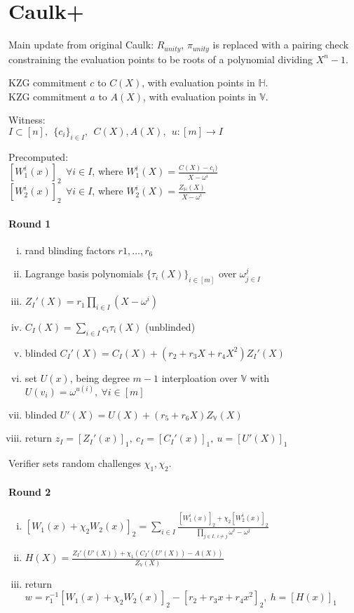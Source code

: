 \documentclass{article}
\theoremstyle{definition}
\begin{document}
\section{Caulk+}
Main update from original Caulk: $R_{unity}$, $\pi_{unity}$ is replaced with a pairing check constraining the evaluation points to be roots of a polynomial dividing $X^n-1$.

KZG commitment $c$ to $C(X)$, with evaluation points in $\mathbb{H}$.\\
KZG commitment $a$ to $A(X)$, with evaluation points in $\mathbb{V}$.

Witness:\\
$I \subset [n], ~~ \{ c_i \}_{i \in I} ,~~ C(X), A(X) ,~~ u: [m] \rightarrow I$

Precomputed:\\
$[W_1^i(x)]_2 ~~\forall i \in I$, where $W_1^i(X) = \frac{C(X) - c_i)}{X-\omega^i}$\\
$[W_2^i(x)]_2 ~~\forall i \in I$, where $W_2^i(X) = \frac{Z_{\mathbb{H}}(X)}{X-\omega^i}$

\paragraph{Round 1}
\begin{enumerate}[i.]
	\item rand blinding factors $r1, \ldots, r_6$
	\item Lagrange basis polynomials $\{ \tau_i(X) \}_{i \in [m]}$ over $\omega^j_{j \in I}$
	\item $Z_I'(X)= r_1 \prod_{i \in I} (X - \omega^i)$
	\item $C_I(X)=\sum_{i \in I} c_i \tau_i(X)$ (unblinded)
	\item blinded $C_I'(X)=C_I(X) + (r_2 + r_3 X + r_4 X^2) Z_I'(X)$
	\item set $U(x)$, being degree $m-1$ interploation over $\mathbb{V}$ with $U(v_i)=\omega^{u(i)},~ \forall i\in [m]$
	\item blinded $U'(X)= U(X) + (r_5 + r_6 X) Z_{\mathbb{V}}(X)$
	\item return $z_I=[Z_I'(x)]_1,~ c_I=[C_I'(x)]_1,~ u=[U'(X)]_1$
\end{enumerate}

Verifier sets random challenges $\chi_1, \chi_2$.

\paragraph{Round 2}
\begin{enumerate}[i.]
	\item $[W_1(x)+ \chi_2 W_2(x)]_2 = \sum_{i \in I} \frac{[W_1^i(x)]_2 + \chi_2 [W_2^i(x)]_2}{\prod_{j \in I,~i \neq j} \omega^i - \omega^j}$
	\item $H(X) = \frac{Z_I'(U'(X)) + \chi_1 (C_I'(U'(X)) - A(X))}{Z_{\mathbb{V}}(X)}$
	\item return $w=r_1^{-1} [W_1(x) + \chi_2 W_2(x)]_2 - [r_2 + r_3 x + r_4 x^2]_2,~ h=[H(x)]_1$
\end{enumerate}
\end{document}
